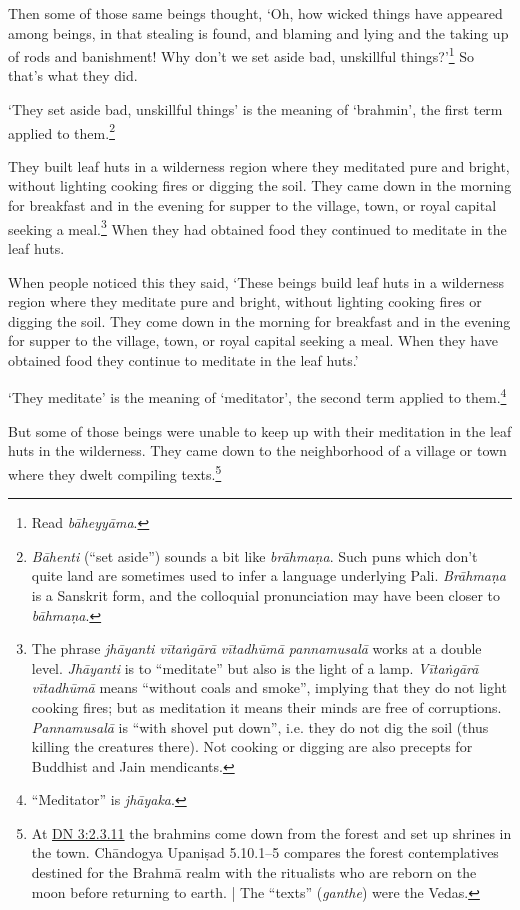 \documentclass[12pt,openany]{book}%
\begin{document}
Then some of those same beings thought, ‘Oh, how wicked things have appeared among beings, in that stealing is found, and blaming and lying and the taking up of rods and banishment! Why don’t we set aside bad, unskillful things?’\footnote{Read \textit{\textsanskrit{bāheyyāma}}. } So that’s what they did. 

‘They set aside bad, unskillful things’ is the meaning of ‘brahmin’, the first term applied to them.\footnote{\textit{\textsanskrit{Bāhenti}} (“set aside”) sounds a bit like \textit{\textsanskrit{brāhmaṇa}}. Such puns which don’t quite land are sometimes used to infer a language underlying Pali. \textit{\textsanskrit{Brāhmaṇa}} is a Sanskrit form, and the colloquial pronunciation may have been closer to \textit{\textsanskrit{bāhmaṇa}}. } 

They built leaf huts in a wilderness region where they meditated pure and bright, without lighting cooking fires or digging the soil. They came down in the morning for breakfast and in the evening for supper to the village, town, or royal capital seeking a meal.\footnote{The phrase \textit{\textsanskrit{jhāyanti} \textsanskrit{vītaṅgārā} \textsanskrit{vītadhūmā} \textsanskrit{pannamusalā}} works at a double level. \textit{\textsanskrit{Jhāyanti}} is to “meditate” but also is the light of a lamp. \textit{\textsanskrit{Vītaṅgārā} \textsanskrit{vītadhūmā}} means “without coals and smoke”, implying that they do not light cooking fires; but as meditation it means their minds are free of corruptions. \textit{\textsanskrit{Pannamusalā}} is “with shovel put down”, i.e.  they do not dig the soil (thus killing the creatures there). Not cooking or digging are also precepts for Buddhist and Jain mendicants. } When they had obtained food they continued to meditate in the leaf huts. 

When people noticed this they said, ‘These beings build leaf huts in a wilderness region where they meditate pure and bright, without lighting cooking fires or digging the soil. They come down in the morning for breakfast and in the evening for supper to the village, town, or royal capital seeking a meal. When they have obtained food they continue to meditate in the leaf huts.’ 

‘They meditate’ is the meaning of ‘meditator’, the second term applied to them.\footnote{“Meditator” is \textit{\textsanskrit{jhāyaka}}. } 

But some of those beings were unable to keep up with their meditation in the leaf huts in the wilderness. They came down to the neighborhood of a village or town where they dwelt compiling texts.\footnote{At \href{https://suttacentral.net/dn3/en/sujato\#2.3.11}{DN 3:2.3.11} the brahmins come down from the forest and set up shrines in the town. \textsanskrit{Chāndogya} \textsanskrit{Upaniṣad} 5.10.1–5 compares the forest contemplatives destined for the \textsanskrit{Brahmā} realm with the ritualists who are reborn on the moon before returning to earth. | The “texts” (\textit{ganthe}) were the Vedas. } 
\end{document}
